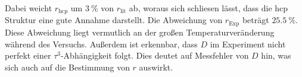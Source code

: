 Dabei weicht $r_\text{hcp}$ um $\SI{3}{\percent}$ von $r_\text{lit}$ ab, woraus sich schliesen lässt, dass die hcp Struktur eine gute 
Annahme darstellt. Die Abweichung von $r_\text{Exp}$ beträgt $\SI{25.5}{\percent}$. Diese Abweichung liegt vermutlich an der großen 
Temperaturveränderung während des Versuchs. Außerdem ist erkennbar, dass $D$ im Experiment nicht perfekt einer $\tau^3$-Abhängigkeit 
folgt. Dies deutet auf Messfehler von $D$ hin, was sich auch auf die Bestimmung von $r$ auswirkt. 
